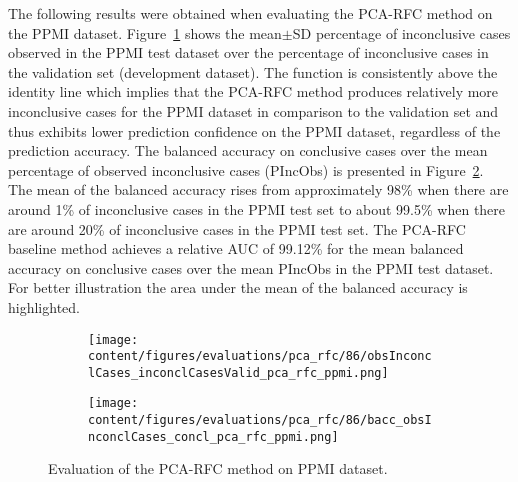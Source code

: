 The following results were obtained when evaluating the PCA-RFC method on the PPMI dataset.
Figure~\ref{fig:obsInconclCases_inconclCasesValid_pca_rfc_ppmi} shows the
mean$\pm$SD percentage of inconclusive cases observed in the PPMI test dataset 
over the percentage of inconclusive cases in the validation set (development dataset).
The function is consistently above the identity line which implies that the PCA-RFC method 
produces relatively more inconclusive cases for the PPMI dataset  
in comparison to the validation set and thus exhibits lower prediction confidence on the PPMI dataset, 
regardless of the prediction accuracy.
The balanced accuracy on conclusive cases over the mean percentage of observed inconclusive cases (PIncObs) is presented 
in Figure~\ref{fig:bacc_obsInconclCases_concl_pca_rfc_ppmi}.
The mean of the balanced accuracy rises from approximately 98\% 
when there are around 1\% of inconclusive cases in the PPMI test set to about 99.5\% 
when there are around 20\% of inconclusive cases in the PPMI test set.
The PCA-RFC baseline method achieves a relative AUC of 99.12\% for the mean balanced accuracy on conclusive cases 
over the mean PIncObs in the PPMI test dataset.
For better illustration the area under the mean of the balanced accuracy is highlighted.


\begin{figure}[ht]
  \begin{subfigure}{0.9\textwidth}
    \centering
    \texttt{[image: content/figures/evaluations/pca\_rfc/86/obsInconclCases\_inconclCasesValid\_pca\_rfc\_ppmi.png]}
    \label{fig:obsInconclCases_inconclCasesValid_pca_rfc_ppmi}
  \end{subfigure}
  \hfill
  \begin{subfigure}{0.9\textwidth}
    \centering
    \texttt{[image: content/figures/evaluations/pca\_rfc/86/bacc\_obsInconclCases\_concl\_pca\_rfc\_ppmi.png]}
    \label{fig:bacc_obsInconclCases_concl_pca_rfc_ppmi}
  \end{subfigure}
  \caption{Evaluation of the PCA-RFC method on PPMI dataset.}
  \label{fig:perf_results_rfc_ppmi}
\end{figure}



